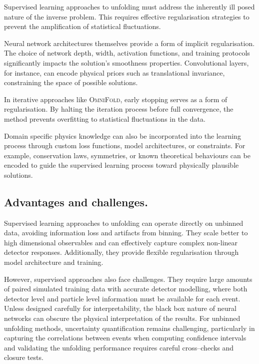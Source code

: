         Supervised learning approaches to unfolding must address the inherently ill posed nature of the inverse problem.
        This requires effective regularisation strategies to prevent the amplification of statistical fluctuations.

        Neural network architectures themselves provide a form of implicit regularisation.
        The choice of network depth, width, activation functions, and training protocols significantly impacts the solution's smoothness properties.
        Convolutional layers, for instance, can encode physical priors such as translational invariance, constraining the space of possible solutions.

        In iterative approaches like \textsc{OmniFold}, early stopping serves as a form of regularisation.
        By halting the iteration process before full convergence, the method prevents overfitting to statistical fluctuations in the data.

        Domain specific physics knowledge can also be incorporated into the learning process through custom loss functions, model architectures, or constraints.
        For example, conservation laws, symmetries, or known theoretical behaviours can be encoded to guide the supervised learning process toward physically plausible solutions.
        
    \subsection{Advantages and challenges.}
    
        Supervised learning approaches to unfolding can operate directly on unbinned data, avoiding information loss and artifacts from binning.
        They scale better to high dimensional observables and can effectively capture complex non-linear detector responses.
        Additionally, they provide flexible regularisation through model architecture and training.

        However, supervised approaches also face challenges.
        They require large amounts of paired simulated training data with accurate detector modelling, where both detector level and particle level information must be available for each event.
        Unless designed carefully for interpretability, the black box nature of neural networks can obscure the physical interpretation of the results.
        For unbinned unfolding methods, uncertainty quantification remains challenging, particularly in capturing the correlations between events when computing confidence intervals and validating the unfolding performance requires careful cross--checks and closure tests.

